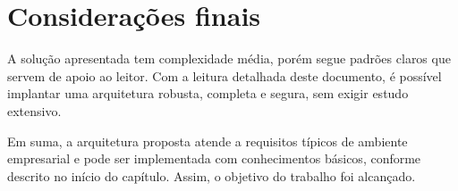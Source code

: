 \section{Considerações finais}
A solução apresentada tem complexidade média, porém segue padrões claros que servem de apoio ao leitor. Com a leitura detalhada deste documento, é possível implantar uma arquitetura robusta, completa e segura, sem exigir estudo extensivo.

Em suma, a arquitetura proposta atende a requisitos típicos de ambiente empresarial e pode ser implementada com conhecimentos básicos, conforme descrito no início do capítulo. Assim, o objetivo do trabalho foi alcançado.

